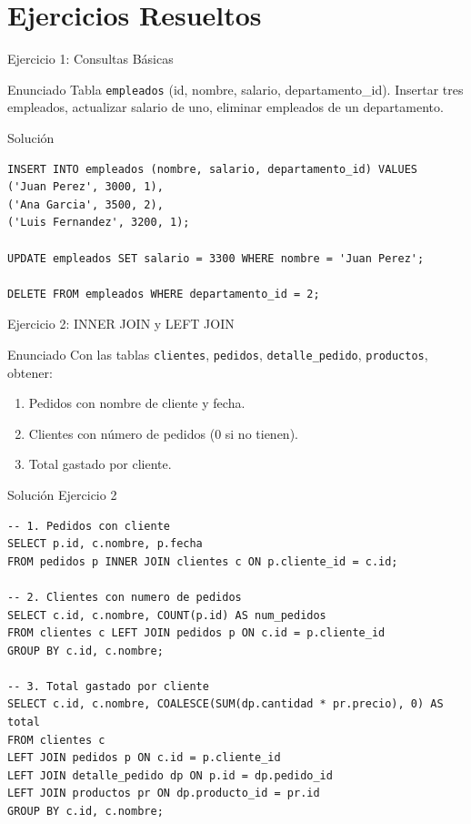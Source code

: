 \documentclass[aspectratio=169, 10pt, xcolor=table]{beamer}
\begin{document}
\section{Ejercicios Resueltos}

\begin{frame}[fragile]{Ejercicio 1: Consultas Básicas}
    \begin{block}{Enunciado}
        Tabla \texttt{empleados} (id, nombre, salario, departamento\_id). Insertar tres empleados, actualizar salario de uno, eliminar empleados de un departamento.
    \end{block}
    \begin{block}{Solución}
        \begin{lstlisting}
INSERT INTO empleados (nombre, salario, departamento_id) VALUES
('Juan Perez', 3000, 1),
('Ana Garcia', 3500, 2),
('Luis Fernandez', 3200, 1);

UPDATE empleados SET salario = 3300 WHERE nombre = 'Juan Perez';

DELETE FROM empleados WHERE departamento_id = 2;
        \end{lstlisting}
    \end{block}
\end{frame}

\begin{frame}[fragile]{Ejercicio 2: INNER JOIN y LEFT JOIN}
    \begin{block}{Enunciado}
        Con las tablas \texttt{clientes}, \texttt{pedidos}, \texttt{detalle\_pedido}, \texttt{productos}, obtener:
        \begin{enumerate}
            \item Pedidos con nombre de cliente y fecha.
            \item Clientes con número de pedidos (0 si no tienen).
            \item Total gastado por cliente.
        \end{enumerate}
    \end{block}
\end{frame}

\begin{frame}[fragile]{Solución Ejercicio 2}
    \begin{lstlisting}
-- 1. Pedidos con cliente
SELECT p.id, c.nombre, p.fecha
FROM pedidos p INNER JOIN clientes c ON p.cliente_id = c.id;

-- 2. Clientes con numero de pedidos
SELECT c.id, c.nombre, COUNT(p.id) AS num_pedidos
FROM clientes c LEFT JOIN pedidos p ON c.id = p.cliente_id
GROUP BY c.id, c.nombre;

-- 3. Total gastado por cliente
SELECT c.id, c.nombre, COALESCE(SUM(dp.cantidad * pr.precio), 0) AS total
FROM clientes c
LEFT JOIN pedidos p ON c.id = p.cliente_id
LEFT JOIN detalle_pedido dp ON p.id = dp.pedido_id
LEFT JOIN productos pr ON dp.producto_id = pr.id
GROUP BY c.id, c.nombre;
    \end{lstlisting}
\end{frame}
\end{document}
